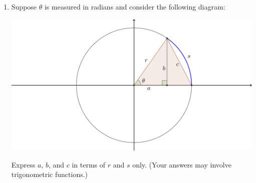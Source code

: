 \documentclass[12pt]{article}
\newif\ifans
\begin{document}
\begin{enumerate}
\ifans\fbox{$h=d\tan\beta-d\tan\alpha$ feet} \fi

\newpage

\item Suppose $\theta$ is measured in radians and consider the following diagram:
\begin{center}
\includegraphics[scale=0.3]{circle.png}
\end{center}
Express $a$, $b$, and $c$ in terms of $r$ and $s$ only. (Your answers may involve trigonometric functions.)

\ifans{\fbox{\parbox{1\linewidth}{
Notice that $\theta = \frac{s}{r}$.  Then, $a=r\cos\left(\frac{s}{r}\right)$ and $b=r\sin\left(\frac{s}{r}\right)$.  Finally, with $a$ and $b$ as described, one can calculate $c=\sqrt{b^2+(r-a)^2}$.
}}} \fi

\end{enumerate}
\end{document}
